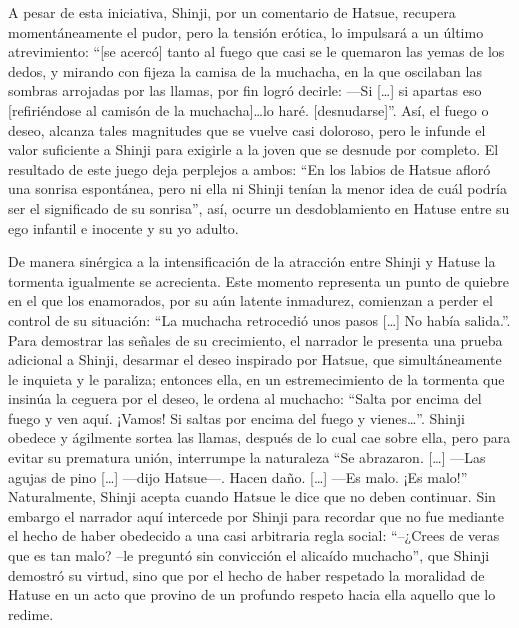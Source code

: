 A pesar de esta iniciativa, Shinji, por un comentario de Hatsue, recupera momentáneamente el pudor, pero la tensión erótica, lo impulsará a un último atrevimiento: ``[se acercó] tanto al fuego que casi se le quemaron las yemas de los dedos, y mirando con fijeza la camisa de la muchacha, en la que oscilaban las sombras arrojadas por las llamas, por fin logró decirle:
—Si [\ldots] si apartas eso [refiriéndose al camisón de la muchacha]\ldots lo haré. [desnudarse]''\autocite{mishima2006}. Así, el fuego o deseo, alcanza tales magnitudes que se vuelve casi doloroso, pero le infunde el valor suficiente a Shinji para exigirle a la joven que se desnude por completo.
El resultado de este juego deja perplejos a ambos: ``En los labios de Hatsue afloró una sonrisa espontánea, pero ni ella ni Shinji tenían la menor idea de cuál podría ser el significado de su sonrisa''\autocite{mishima2006}, así, ocurre un desdoblamiento en Hatuse entre su ego infantil e inocente y su yo adulto. 

De manera sinérgica a la intensificación de la atracción entre Shinji y Hatuse la tormenta igualmente se acrecienta. Este momento representa un punto de quiebre en el que los enamorados, por su aún latente inmadurez, comienzan a perder el control de su situación: ``La muchacha retrocedió unos pasos [\ldots] No había salida.''\autocite{mishima2006}. Para demostrar las señales de su crecimiento, el narrador le presenta una prueba adicional a Shinji, desarmar el deseo inspirado por Hatsue, que simultáneamente le inquieta y le paraliza; entonces ella, en un estremecimiento de la tormenta que insinúa la ceguera por el deseo, le ordena al muchacho: ``Salta por encima del fuego y ven aquí. ¡Vamos! Si saltas por encima del fuego y vienes\ldots''\autocite{mishima2006}. Shinji obedece y ágilmente sortea las llamas, después de lo cual cae sobre ella, pero para evitar su prematura unión, interrumpe la naturaleza ``Se abrazaron. [\ldots] —Las agujas de pino [\ldots] —dijo Hatsue—. Hacen daño. [\ldots] —Es malo. ¡Es malo!''\autocite{mishima2006} Naturalmente, Shinji acepta cuando Hatsue le dice que no deben continuar. Sin embargo el narrador aquí intercede por Shinji para recordar que no fue mediante el hecho de haber obedecido a una casi arbitraria regla social: ``--¿Crees de veras que es tan malo? --le preguntó sin convicción el alicaído muchacho''\autocite{mishima2006}, que Shinji demostró su virtud, sino que por el hecho de haber respetado la moralidad de  Hatuse en un acto que provino de un profundo respeto hacia ella aquello que lo redime. 

